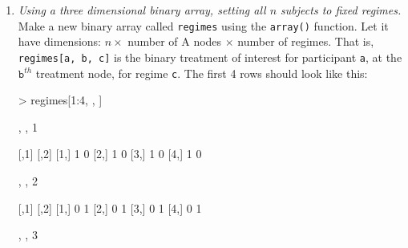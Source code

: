 \documentclass[answers]{exam}
\begin{document}
\begin{enumerate}
\begin{enumerate}
\item \textit{Using a three dimensional binary array, setting all $n$ subjects to fixed regimes.} Make a new binary array called \texttt{regimes} using the \texttt{array()} function. Let it have dimensions: $n \times$ number of A nodes $\times$ number of regimes. That is, \texttt{regimes[a, b, c]} is the binary treatment of interest for participant \texttt{a}, at the $\texttt{b}^{th}$ treatment node, for regime \texttt{c}.
The first 4 rows should look like this:
\begin{Schunk}
\begin{Sinput}
> regimes[1:4, , ] 
\end{Sinput}
\begin{Soutput}
, , 1

     [,1] [,2]
[1,]    1    0
[2,]    1    0
[3,]    1    0
[4,]    1    0

, , 2

     [,1] [,2]
[1,]    0    1
[2,]    0    1
[3,]    0    1
[4,]    0    1

, , 3


\end{Soutput}
\end{Schunk}
\end{enumerate}
\end{enumerate}
\end{document}
